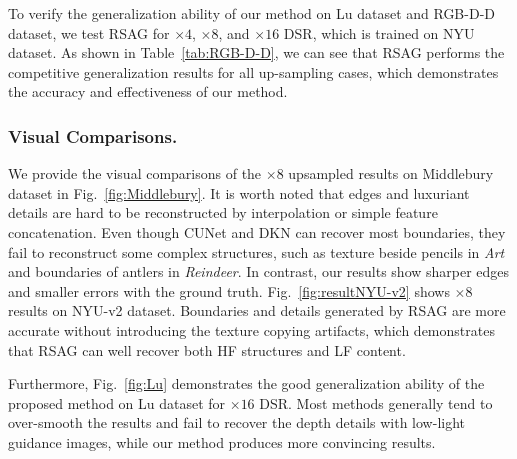 \documentclass[letterpaper]{article} %
\begin{document}
To verify the generalization ability of our method on Lu dataset and RGB-D-D dataset, we test RSAG for $\times4$, $\times8$, and $\times16$ DSR, which is trained on NYU dataset. As shown in Table~\ref{tab:RGB-D-D}, we can see that RSAG performs the competitive generalization results for all up-sampling cases, which demonstrates the accuracy and effectiveness of our method.

\subsubsection{Visual Comparisons.} 
We provide the visual comparisons of the $\times8$ upsampled results on Middlebury dataset in Fig.~\ref{fig:Middlebury}.
It is worth noted that edges and luxuriant details are hard to be reconstructed by interpolation or simple feature concatenation. Even though CUNet \cite{deng2020deep} and DKN \cite{kim2021deformable} can recover most boundaries, they fail to reconstruct some complex structures, such as texture beside pencils in \textit{Art} and boundaries of antlers in \textit{Reindeer}. In contrast, our results show sharper edges and smaller errors with the ground truth.
Fig.~\ref{fig:resultNYU-v2} shows $\times8$ results on NYU-v2 dataset. Boundaries and details generated by RSAG are more accurate without introducing the texture copying artifacts, which demonstrates that RSAG can well recover both HF structures and LF content.

Furthermore, Fig.~\ref{fig:Lu} demonstrates the good generalization ability of the proposed method on Lu dataset for $\times16$ DSR. Most methods generally tend to over-smooth the results and fail to recover the depth details with low-light guidance images, while our method produces more convincing results.


\begin{table}[t]
	\centering
\caption{Ablation studies of RSAG (in MAD) on Middlebury dataset and (in RMSE) on  NYU-v2 dataset  for $\times8$ DSR.}
\label{tab:Ablation1}
\end{table}
\end{document}
